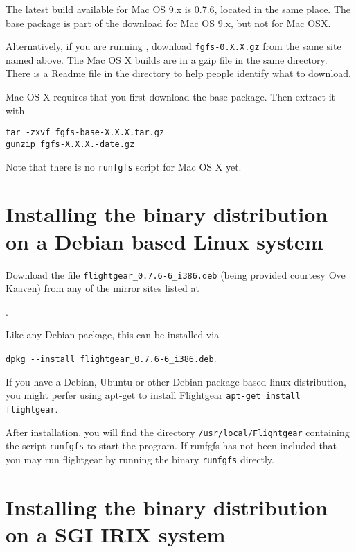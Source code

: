 The latest build available for Mac OS 9.x is 0.7.6, located in the same place. The base package is part of the download for Mac OS 9.x, but not for Mac OSX.

Alternatively, if you are running , download \texttt{fgfs-0.X.X.gz} from
the same site named above. The Mac OS X  builds are in a gzip file in the same directory. There is a Readme file in the directory to help people identify what to download. 

Mac OS X requires that you first download the base package. Then extract it with

\noindent
\texttt{tar -zxvf fgfs-base-X.X.X.tar.gz}\\
\texttt{gunzip fgfs-X.X.X.-date.gz}

\noindent
Note that there is no \texttt{runfgfs} script for Mac OS X yet.

\section{Installing the binary distribution on a Debian based Linux system}


Download the file \verb/flightgear_0.7.6-6_i386.deb/ (being provided courtesy Ove
Kaaven) from any of the  mirror sites listed at
 \medskip

.
 \medskip

 \noindent
 Like any Debian package, this can be installed via
 \medskip

  \verb/dpkg --install flightgear_0.7.6-6_i386.deb/.
\medskip

If you have a Debian, Ubuntu or other Debian package based linux distribution, you might perfer using apt-get to install Flightgear \texttt{apt-get install flightgear}.

 \noindent
 After installation, you will find the directory \texttt{/usr/local/Flightgear}
containing the script \texttt{runfgfs} to start the program. If runfgfs has not been included that you may run flightgear by running the binary \texttt{runfgfs} directly.


\section{Installing the binary distribution on a SGI IRIX system}


